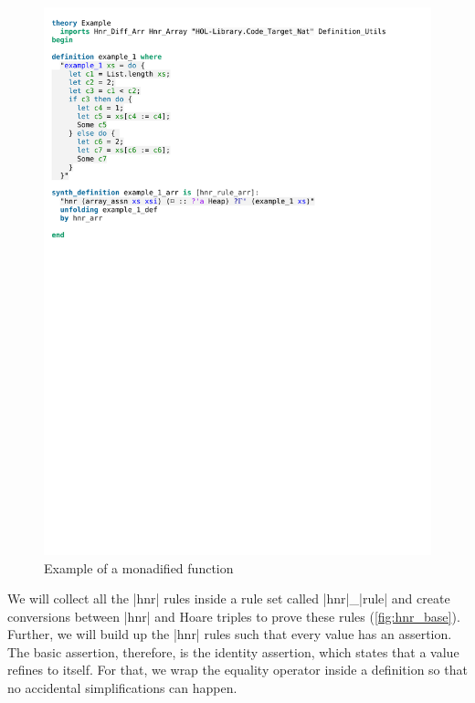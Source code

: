 \begin{figure}[htpb]
    \includegraphics[trim={0 20,2cm 0 2,4cm}, clip, width=1.00\textwidth]{figures/Theory_Example.pdf}
    \caption[Example of a monadified function]{Example of a monadified function}
    \label{fig:monadified_example}
\end{figure}

\noindent We will collect all the |hnr| rules inside a rule set called |hnr|\_|rule| and create conversions between |hnr| and Hoare triples to prove these rules (\autoref{fig:hnr_base}).\\
Further, we will build up the |hnr| rules such that every value has an assertion. The basic assertion, therefore, is the identity assertion, which states that a value refines to itself. For that, we wrap the equality operator inside a definition so that no accidental simplifications can happen.

